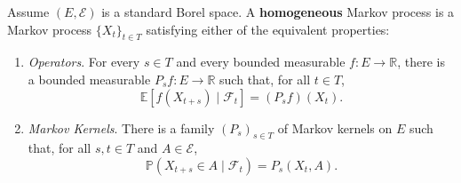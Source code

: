 	\begin{definition}
		Assume $(E, \mathcal{E})$ is a standard Borel space. A \textbf{homogeneous} Markov process is a Markov process $\{X_t\}_{t \in T}$ satisfying either of the equivalent properties: 
		\begin{enumerate}
		  \item \textit{Operators}. For every $s \in T$ and every bounded measurable $f : E \to \mathbb{R}$, there is a bounded measurable $P_s f : E \to \mathbb{R}$ such that, for all $t \in T$,
			\[
				\mathbb{E}[f(X_{t+s}) \mid \mathcal{F}_t] = (P_s f)(X_t).
			\]
			\item \textit{Markov Kernels}. There is a family $(P_s)_{s \in T}$ of Markov kernels on $E$ such that, for all $s, t \in T$ and $A \in \mathcal{E}$,
			\[
				\mathbb{P}(X_{t+s} \in A \mid \mathcal{F}_t) = P_s(X_t, A).
			\]
		\end{enumerate}
	\end{definition}
